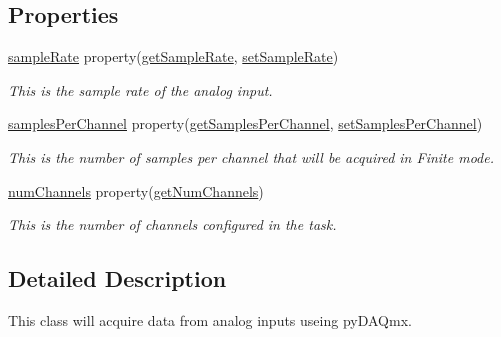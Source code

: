 \subsection*{Properties}
\begin{DoxyCompactItemize}
\item 
\hyperlink{class_chassis_8git_1_1_analog_input_1_1_analog_input_a4850b3ba42ea425bd1ecff3bee19e788}{sample\-Rate} property(\hyperlink{class_chassis_8git_1_1_analog_input_1_1_analog_input_a43e4039d06268d400c247a6072aedf2d}{get\-Sample\-Rate}, \hyperlink{class_chassis_8git_1_1_analog_input_1_1_analog_input_ad30e424927b40e03bd423e0ba5cf7351}{set\-Sample\-Rate})
\begin{DoxyCompactList}\small\item\em This is the sample rate of the analog input. \end{DoxyCompactList}\item 
\hyperlink{class_chassis_8git_1_1_analog_input_1_1_analog_input_a2a0d9c7ca2844846004487e801df19f5}{samples\-Per\-Channel} property(\hyperlink{class_chassis_8git_1_1_analog_input_1_1_analog_input_a2fc26a83c3c212ce6710967957326d3b}{get\-Samples\-Per\-Channel}, \hyperlink{class_chassis_8git_1_1_analog_input_1_1_analog_input_aaef7ff9115abe6745708029a9816eb93}{set\-Samples\-Per\-Channel})
\begin{DoxyCompactList}\small\item\em This is the number of samples per channel that will be acquired in Finite mode. \end{DoxyCompactList}\item 
\hyperlink{class_chassis_8git_1_1_analog_input_1_1_analog_input_ab520bf23d3d0edf2cd7583b93eee593a}{num\-Channels} property(\hyperlink{class_chassis_8git_1_1_analog_input_1_1_analog_input_a841c957f25e3cf82bb390a35fcbf5d72}{get\-Num\-Channels})
\begin{DoxyCompactList}\small\item\em This is the number of channels configured in the task. \end{DoxyCompactList}\end{DoxyCompactItemize}


\subsection{Detailed Description}
This class will acquire data from analog inputs useing py\-D\-A\-Qmx. 



